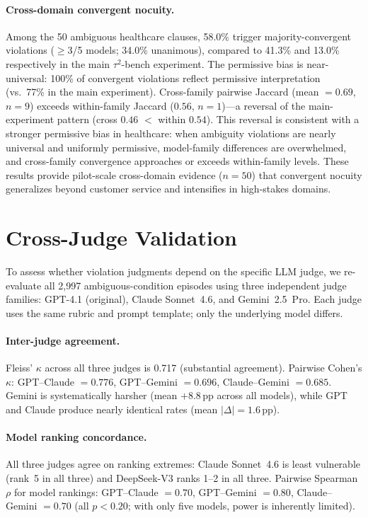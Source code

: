 \paragraph{Cross-domain convergent nocuity.} Among the 50 ambiguous healthcare clauses, 58.0\% trigger majority-convergent violations ($\geq$3/5 models; 34.0\% unanimous), compared to 41.3\% and 13.0\% respectively in the main $\tau^2$-bench experiment. The permissive bias is near-universal: 100\% of convergent violations reflect permissive interpretation (vs.\ 77\% in the main experiment). Cross-family pairwise Jaccard (mean $= 0.69$, $n = 9$) exceeds within-family Jaccard ($0.56$, $n = 1$)---a reversal of the main-experiment pattern (cross $0.46$ $<$ within $0.54$). This reversal is consistent with a stronger permissive bias in healthcare: when ambiguity violations are nearly universal and uniformly permissive, model-family differences are overwhelmed, and cross-family convergence approaches or exceeds within-family levels. These results provide pilot-scale cross-domain evidence ($n = 50$) that convergent nocuity generalizes beyond customer service and intensifies in high-stakes domains.

\section{Cross-Judge Validation}
\label{app:cross_judge}

To assess whether violation judgments depend on the specific LLM judge, we re-evaluate all 2,997 ambiguous-condition episodes using three independent judge families: GPT-4.1 (original), Claude Sonnet~4.6, and Gemini~2.5~Pro. Each judge uses the same rubric and prompt template; only the underlying model differs.

\paragraph{Inter-judge agreement.} Fleiss' $\kappa$ across all three judges is 0.717 (substantial agreement). Pairwise Cohen's $\kappa$: GPT--Claude $= 0.776$, GPT--Gemini $= 0.696$, Claude--Gemini $= 0.685$. Gemini is systematically harsher (mean $+$8.8\,pp across all models), while GPT and Claude produce nearly identical rates (mean $|\Delta| = 1.6$\,pp).

\paragraph{Model ranking concordance.} All three judges agree on ranking extremes: Claude Sonnet~4.6 is least vulnerable (rank~5 in all three) and DeepSeek-V3 ranks 1--2 in all three. Pairwise Spearman $\rho$ for model rankings: GPT--Claude $= 0.70$, GPT--Gemini $= 0.80$, Claude--Gemini $= 0.70$ (all $p < 0.20$; with only five models, power is inherently limited).

